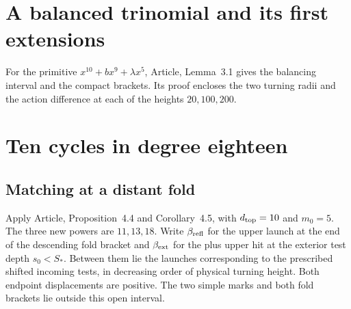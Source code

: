 \section{A balanced trinomial and its first extensions}\label{sec:balanced}\hypertarget{seed.balance}{}
For the primitive $x^{10}+bx^9+\lambda x^5$, Article, Lemma~3.1
gives the balancing interval and the compact brackets. Its proof
encloses the two turning radii and the action difference at each of
the heights $20,100,200$.


\section{Ten cycles in degree eighteen}\label{sec:six}
\subsection{Matching at a distant fold}\label{subsec:supp-fold}
Apply Article, Proposition~4.4 and Corollary~4.5, with $d_{\rm top}=10$
and $m_0=5$. The three new powers are $11,13,18$. Write
$\beta_{\rm refl}$ for the upper launch at the end of the descending
fold bracket and $\beta_{\rm ext}$ for the plus upper hit at the
exterior test depth $s_0<S_*$. Between them lie the launches
corresponding to the prescribed shifted incoming tests, in decreasing
order of physical turning height. Both endpoint displacements are
positive. The two simple marks and both fold brackets lie outside
this open interval.





